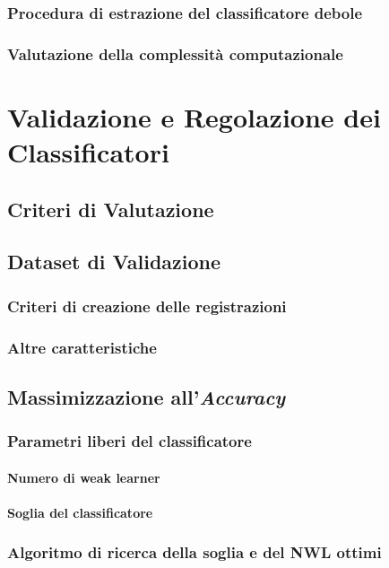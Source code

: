         \subsection{Procedura di estrazione del classificatore debole}
        \subsection{Valutazione della complessità computazionale}

\chapter{Validazione e Regolazione dei Classificatori}
\label{chap:tuning}
    \section{Criteri di Valutazione}
    \label{sec:evaluation_criteria}
    \section{Dataset di Validazione}
    \label{sec:validation_dataset}
        \subsection{Criteri di creazione delle registrazioni}
        \subsection{Altre caratteristiche}
    \section{Massimizzazione all'\emph{Accuracy}}
    \label{sec:accuracy_maximization}
        \subsection{Parametri liberi del classificatore}
            \subsubsection{Numero di weak learner}
            \subsubsection{Soglia del classificatore}
        \subsection{Algoritmo di ricerca della soglia e del NWL ottimi}
